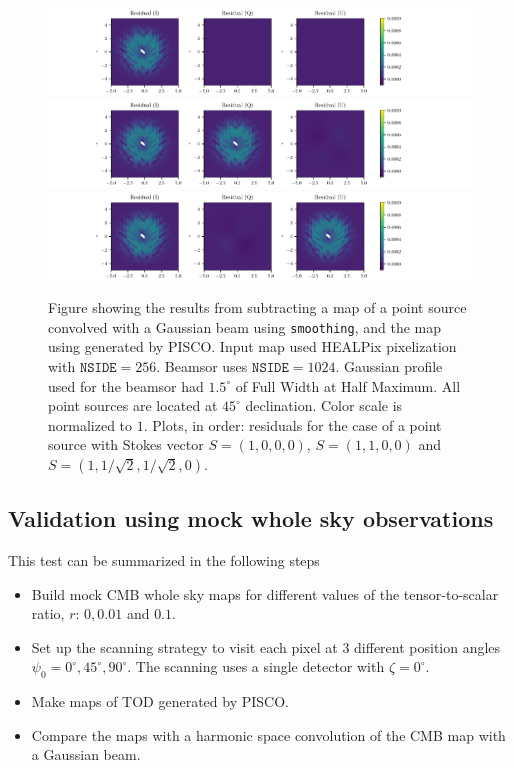 \documentclass[a4paper,fleqn]{cas-dc}\sloppy
\begin{document}
	\begin{figure}
		\centering
		\includegraphics[width=1.0\linewidth]{figures/stokes_I_source_256_beam_1024_dec_45.pdf}
		\includegraphics[width=1.0\linewidth]{figures/stokes_Q_source_256_beam_1024_dec_45.pdf}
		\includegraphics[width=1.0\linewidth]{figures/stokes_U_source_256_beam_1024_dec_45.pdf}
		\caption{Figure showing the results from subtracting a map of a point source convolved with a Gaussian beam using \texttt{smoothing}, and the map using generated by PISCO. Input map used HEALPix pixelization with $\mathrm{\texttt{NSIDE}} = 256$. Beamsor uses $\mathrm{\texttt{NSIDE}} = 1024$. Gaussian profile used for the beamsor had $1.5^\circ$ of Full Width at Half Maximum. All point sources are located at $45^\circ$ declination. Color scale is normalized to $1$. Plots, in order: residuals for the case of a point source with Stokes vector $S = (1,0,0,0)$, $S=(1,1,0,0)$ and $S=(1,1/\sqrt{2},1/\sqrt{2},0)$. }
		\label{fig::stokesqsource256beam1024dec45}
	\end{figure}
	
	\subsection{Validation using mock whole sky observations}
	\label{sec::val_sky}
	This test can be summarized in the following steps
	
	\begin{itemize}
		\item Build mock CMB whole sky maps for different values of the tensor-to-scalar ratio, $r$: $0, 0.01$ and $0.1$.
		\item Set up the scanning strategy to visit each pixel at 3 different position angles $\psi_0 = 0^{\circ},45^{\circ},90^{\circ}$. The scanning uses a single detector with $\zeta=0^\circ$.
		\item Make maps of TOD generated by PISCO. 
		\item Compare the maps with a harmonic space convolution of the CMB map with a Gaussian beam.
	\end{itemize}
	
\end{document}
